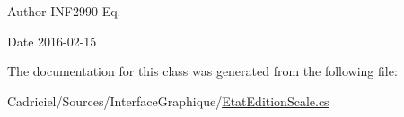 \begin{DoxyAuthor}{Author}
I\+N\+F2990 Eq. 
\end{DoxyAuthor}
\begin{DoxyDate}{Date}
2016-\/02-\/15 
\end{DoxyDate}


The documentation for this class was generated from the following file\+:\begin{DoxyCompactItemize}
\item 
Cadriciel/\+Sources/\+Interface\+Graphique/\hyperlink{_etat_edition_scale_8cs}{Etat\+Edition\+Scale.\+cs}\end{DoxyCompactItemize}
